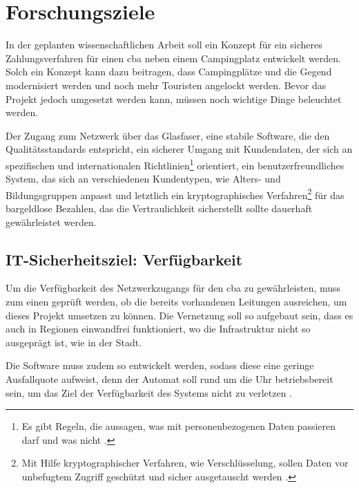 \section{Forschungsziele}


In der geplanten wissenschaftlichen Arbeit soll ein Konzept für ein sicheres Zahlungsverfahren 
für einen \acrshort{cba} neben einem Campingplatz entwickelt werden. Solch ein Konzept kann
dazu beitragen, dass Campingplätze und die Gegend modernisiert werden und noch mehr Touristen 
angelockt werden. Bevor das Projekt jedoch umgesetzt werden kann, müssen noch wichtige Dinge 
beleuchtet werden. 


Der Zugang zum Netzwerk über das Glasfaser, eine stabile Software, die 
den Qualitätsstandards entspricht, ein sicherer Umgang mit Kundendaten, der sich an spezifischen und
internationalen Richtlinien\footnote{Es gibt Regeln, die aussagen, was mit personenbezogenen Daten passieren
darf und was nicht \cite{refart:DSDS}.} orientiert, ein benutzerfreundliches System, das sich an verschiedenen 
Kundentypen, wie Alters- und Bildungsgruppen anpasst und letztlich ein kryptographisches Verfahren\footnote{Mit
Hilfe kryptographischer Verfahren, wie Verschlüsselung, sollen Daten vor unbefugtem Zugriff geschützt und sicher 
ausgetauscht werden \cite{refart:SLWK}.} für das bargeldlose Bezahlen, das die Vertraulichkeit sicherstellt sollte dauerhaft gewährleistet werden.


\subsection{IT-Sicherheitsziel: Verfügbarkeit}
Um die Verfügbarkeit des Netzwerkzugangs für den \acrshort{cba} zu gewährleisten, muss zum einen 
geprüft werden, ob die bereits vorhandenen Leitungen ausreichen, um dieses Projekt umsetzen zu können.
Die Vernetzung soll so aufgebaut sein, dass es auch in Regionen einwandfrei funktioniert, wo die
Infrastruktur nicht so ausgeprägt ist, wie in der Stadt. 


Die Software muss zudem so entwickelt werden, sodass diese eine geringe Ausfallquote aufweist, denn der
Automat soll rund um die Uhr betriebsbereit sein, um das Ziel der Verfügbarkeit des Systems nicht zu 
verletzen \cite{refbook:SWIS}.

